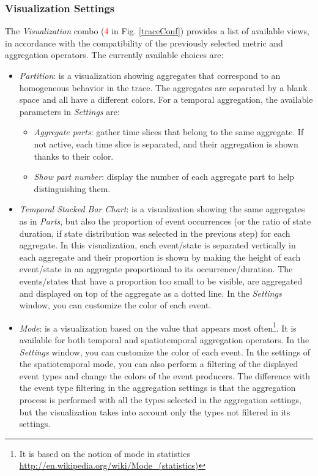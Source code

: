\documentclass[twoside]{article}
\begin{document}
\begin{sloppypar}
\subsubsection{Visualization Settings}
\label{visuop}
The \textit{Visualization} combo (\textcolor{red}{4} in Fig. \ref{traceConf}) provides a list of available views, in accordance with the compatibility of the previously selected metric and aggregation operators. The currently available choices are:
\begin{itemize}
	\item \textit{Partition}: is a visualization showing aggregates that correspond to an homogeneous behavior in the trace. The aggregates are separated by a blank space and all have a different colors. For a temporal aggregation, the available parameters in \textit{Settings} are:
	\begin{itemize}
		\item \textit{Aggregate parts}: gather time slices that belong to the same aggregate. If not active, each time slice is separated, and their aggregation is shown thanks to their color.
		\item \textit{Show part number}: display the number of each aggregate part to help distinguishing them.
	\end{itemize}
	\item \textit{Temporal Stacked Bar Chart}: is a visualization showing the same aggregates as in \textit{Parts}, but also the proportion of event occurrences (or the ratio of state duration, if state distribution was selected in the previous step) for each aggregate. In this visualization, each event/state is separated vertically in each aggregate and their proportion is shown by making the height of each event/state in an aggregate proportional to its occurrence/duration. The events/states that have a proportion too small to be visible, are aggregated and displayed on top of the aggregate as a dotted line. In the \textit{Settings} window, you can customize the color of each event.
	\item \textit{Mode}: is a visualization based on the value that appears most often\footnote{It is based on the notion of mode in statistics \url{http://en.wikipedia.org/wiki/Mode_(statistics)}}. It is available for both temporal and spatiotemporal aggregation operators. In the \textit{Settings} window, you can customize the color of each event. In the settings of the spatiotemporal mode, you can also perform a filtering of the displayed event types and change the colors of the event producers. The difference with the event type filtering in the aggregation settings is that the aggregation process is performed with all the types selected in the aggregation settings, but the visualization takes into account only the types not filtered in its settings. 
\end{itemize}


\end{sloppypar}
\end{document}
